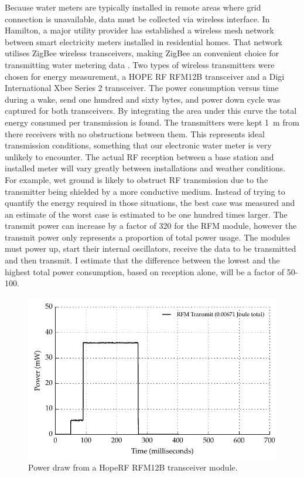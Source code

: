     Because water meters are typically installed in remote areas where grid connection is unavailable, data must be collected via wireless interface.
    In Hamilton, a major utility provider has established a wireless mesh network between smart electricity meters installed in residential homes.
    That network utilises ZigBee wireless transceivers, making ZigBee an convenient choice for transmitting water metering data \cite{MalcolmSouness-WELNetworks2012}.
    Two types of wireless transmitters were chosen for energy measurement, a HOPE RF RFM12B transceiver and a Digi International Xbee Series 2 transceiver.
    The power consumption versus time during a wake, send one hundred and sixty bytes, and power down cycle was captured for both transceivers.
    By integrating the area under this curve the total energy consumed per transmission is found.
    The transmitters were kept \SI{1}{\meter} from there receivers with no obstructions between them.
    This represents ideal transmission conditions, something that our electronic water meter is very unlikely to encounter.
    The actual RF reception between a base station and installed meter will vary greatly between installations and weather conditions.
    For example, wet ground is likely to obstruct RF transmission due to the transmitter being shielded by a more conductive medium.
    Instead of trying to quantify the energy required in those situations, the best case was measured and an estimate of the worst case is estimated to be one hundred times larger.
    The transmit power can increase by a factor of 320 for the RFM module, however the transmit power only represents a proportion of total power usage.
    The modules must power up, start their internal oscillators, receive the data to be transmitted and then transmit.
    I estimate that the difference between the lowest and the highest total power consumption, based on reception alone, will be a factor of 50-100.

    \begin{figure}
      \centering
      \includegraphics{content/pt1/03-EnergyRequirements/graphics/Graph_RFMPower.pdf}
      \caption{\label{fig:Energy-consumed-RFM12B}Power draw from a HopeRF RFM12B transceiver module.}
    \end{figure}

